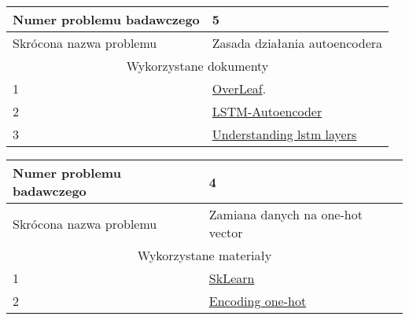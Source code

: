 \documentclass[11pt,a4paper]{article}
\begin{document}
\begin{table}[h]
    \centering
    \begin{tabular}{|p{4.5cm}|p{9cm}|}
        \hline
         Numer problemu badawczego & 5 \\
         \hline
         Skrócona nazwa problemu & Zasada działania autoencodera\\
         \hline
         \multicolumn{2}{|c|}{Wykorzystane dokumenty} \\ \hline
         1 &  \href{http://www.latex-tutorial.com}{OverLeaf}. \\ \hline
         2 &  \href{https://machinelearningmastery.com/lstm-autoencoders/}{LSTM-Autoencoder}\\ \hline
         3 & \href{https://towardsdatascience.com/step-by-step-understanding-lstm-autoencoder-layers-ffab055b6352}{Understanding lstm layers}\\ \hline
    \end{tabular}
    \label{tab:my_label4}
\end{table}

\begin{table}[h]
    \centering
    \begin{tabular}{|p{4.5cm}|p{9cm}|}
        \hline
         Numer problemu badawczego & 4 \\
         \hline
         Skrócona nazwa problemu & Zamiana danych na one-hot vector\\
         \hline
         \multicolumn{2}{|c|}{Wykorzystane materiały} \\ \hline
         1 &  \href{https://scikit-learn.org/stable/}{SkLearn} \\ \hline
         2 &  \href{https://machinelearningmastery.com/how-to-one-hot-encode-sequence-data-in-python/}{Encoding one-hot}\\ \hline
    \end{tabular}
    \label{tab:my_label4}
\end{table}
\end{document}
